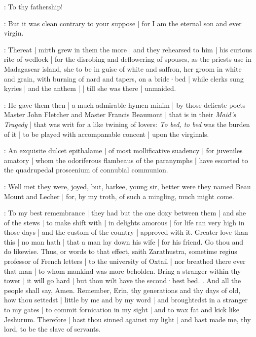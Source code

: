 \All:
To thy fathership!

\stephen:
But it was clean contrary to your suppose |
for I am the eternal son and ever virgin.

:
Thereat |
mirth grew in them the more |
and they rehearsed to him |
his curious rite of wedlock |
for the disrobing and deflowering of spouses,
as the priests use in Madagascar island,
she to be in guise of white and saffron,
her groom in white and grain,
with burning of nard and tapers,
on a bride·bed |
while clerks sung kyries |
and the anthem |
 |
till she was there |
unmaided.

:
He gave them then |
a much admirable hymen minim |
by those delicate poets Master John Fletcher and Master Francis Beaumont |
that is in their \emph{Maid's Tragedy} |
that was writ for a like twining of lovers:
\emph{To bed, to bed}
was the burden of it |
to be played with accompanable concent |
upon the virginals.

\stephen:
An exquisite dulcet epithalame |
of most mollificative suadency |
for juveniles amatory |
whom the odoriferous flambeaus of the paranymphs |
have escorted to the quadrupedal proscenium of connubial communion.

\dixon:
Well met they were,
joyed,
but,
harkee,
young sir,
better were they named Beau Mount and Lecher |
for,
by my troth,
of such a mingling,
much might come.

\stephen:
To my best remembrance |
they had but the one doxy between them |
and she of the stews |
to make shift with |
in delights amorous |
for life ran very high in those days |
and the custom of the country |
approved with it.
Greater love than this |
no man hath |
that a man lay down his wife |
for his friend.
Go thou
and do likewise.
Thus,
or words to that effect,
saith Zarathustra,
sometime regius professor of French letters |
to the university of Oxtail |
nor breathed there ever that man |
to whom mankind was more beholden.
Bring a stranger within thy tower |
it will go hard |
but thou wilt have the second·best bed.
.
And all the people shall say,
Amen.
Remember,
Erin,
thy generations and thy days of old,
how thou settedst |
little by me and by my word |
and broughtedst in a stranger to my gates |
to commit fornication in my sight |
and to wax fat and kick like Jeshurum.
Therefore |
hast thou sinned against my light |
and hast made me,
thy lord,
to be the slave of servants.


